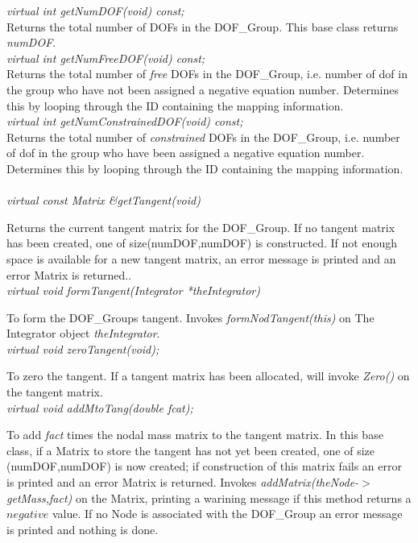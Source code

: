 {\em virtual int getNumDOF(void) const;}\\
Returns the total number of DOFs in the DOF\_Group. This base class
returns {\em numDOF}.\\

{\em virtual int getNumFreeDOF(void) const;}\\
Returns the total number of {\em free} DOFs in the DOF\_Group,
i.e. number of dof in the group who have not been assigned a negative
equation number. Determines this by looping through the ID containing
the mapping information. \\

{\em virtual int getNumConstrainedDOF(void) const;}\\
Returns the total number of {\em constrained} DOFs in the DOF\_Group,
i.e. number of dof in the group who have been assigned a negative
equation number. Determines this by looping through the ID containing
the mapping information. \\


  \\ 
{\em virtual const Matrix \&getTangent(void)} 

Returns the current tangent matrix for the DOF\_Group. If no tangent
matrix has been created, one of size(numDOF,numDOF) is constructed.
If not enough space is available for a new tangent matrix, an error
message is printed and an error Matrix is returned.. \\  

{\em virtual void formTangent(Integrator *theIntegrator)} 

To form the DOF\_Groups tangent. Invokes {\em formNodTangent(this)} on
The Integrator object {\em theIntegrator}. \\

{\em virtual void zeroTangent(void);}

To zero the tangent. If a tangent matrix has been allocated,
will invoke {\em Zero()} on the tangent matrix.\\

{\em virtual void addMtoTang(double fcat);}

To add {\em fact} times the nodal mass matrix to the tangent
matrix. In this base class, if a Matrix to store the tangent has not
yet been created, one of size (numDOF,numDOF) is now created; if
construction of this matrix fails an error is printed and an error
Matrix is returned. Invokes {\em addMatrix(theNode-$>$getMass,fact)}
on the Matrix, printing a warining message if this method returns a
$negative$ value. If no Node is associated with the DOF\_Group an
error message is printed and nothing is done. \\

